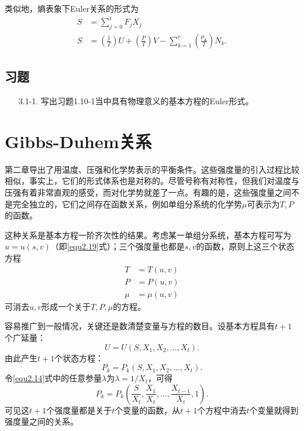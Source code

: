 类似地，熵表象下Euler关系的形式为
\begin{align}
    S &= \sum_{j = 0}^t F_j X_j \label{equ3.7} \\
    S &= \left(\frac{1}{T} \right) U + \left( \frac{P}{T} \right) V - \sum_{k = 1}^r \left( \frac{\mu_k}{T} \right) N_k. \label{equ3.8}
\end{align}

\subsection*{习题}
\begin{itemize}	
\item[3.1-1.] 写出习题1.10-1当中具有物理意义的基本方程的Euler形式。
\end{itemize}

\section{Gibbs-Duhem关系}
\label{sec3.2}
第二章导出了用温度、压强和化学势表示的平衡条件。这些强度量的引入过程比较相似，事实上，它们的形式体系也是对称的。尽管号称有对称性，但我们对温度与压强有着非常直观的感受，而对化学势就差了一点。有趣的是，这些强度量之间不是完全独立的，它们之间存在函数关系，例如单组分系统的化学势$\mu$可表示为$T, P$的函数。

这种关系是基本方程一阶齐次性的结果。考虑某一单组分系统，基本方程可写为$u = u(s, v)$（即\eqref{equ2.19}式）；三个强度量也都是$s, v$的函数，原则上这三个状态方程
\begin{align*}
    T &= T(u, v) \\
    P &= P(u, v) \\
    \mu &= \mu (u, v)
\end{align*}
可消去$u, v$形成一个关于$T, P, \mu$的方程。

容易推广到一般情况，关键还是数清楚变量与方程的数目。设基本方程具有$t + 1$个广延量：
\begin{equation}
\label{equ3.9}
    U = U(S, X_1, X_2, \dots, X_t).
\end{equation}
由此产生$t + 1$个状态方程：
\begin{equation}
\label{equ3.10}
    P_k = P_k(S, X_1, X_2, \dots, X_t).
\end{equation}
令\eqref{equ2.14}式中的任意参量$\lambda$为$\lambda = 1 / X_t$，可得
\begin{equation}
\label{equ3.11}
	P_k = P_k \left( \frac{S}{X_t}, \frac{X_1}{X_t}, \dots, \frac{X_{t-1}}{X_t}, 1 \right).
\end{equation}
可见这$t + 1$个强度量都是关于$t$个变量的函数，从$t + 1$个方程中消去$t$个变量就得到强度量之间的关系。

